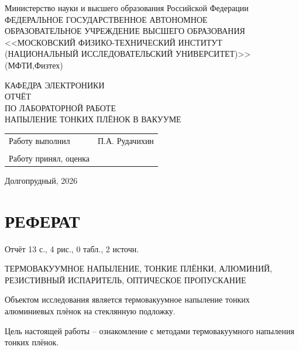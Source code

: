 \documentclass[a4paper, 14pt]{extarticle}
\begin{document}
	
	\begin{titlepage}
		\centering
		{ Министерство науки и высшего образования Российской Федерации\\
		ФЕДЕРАЛЬНОЕ ГОСУДАРСТВЕННОЕ АВТОНОМНОЕ \\
		ОБРАЗОВАТЕЛЬНОЕ УЧРЕЖДЕНИЕ ВЫСШЕГО ОБРАЗОВАНИЯ \\
		<<МОСКОВСКИЙ ФИЗИКО-ТЕХНИЧЕСКИЙ ИНСТИТУТ\\
		(НАЦИОНАЛЬНЫЙ ИССЛЕДОВАТЕЛЬСКИЙ УНИВЕРСИТЕТ)>>\\
		(МФТИ,Физтех)
		}
		
		\vspace{6cm}
		
		КАФЕДРА ЭЛЕКТРОНИКИ\\
		\vspace{0.5cm}
		ОТЧЁТ \\
		ПО ЛАБОРАТОРНОЙ РАБОТЕ\\
		\vspace{0.5cm}
		{{НАПЫЛЕНИЕ ТОНКИХ ПЛЁНОК В ВАКУУМЕ}\\}
		
		\vspace{5cm}
		
		\begin{tabular}{ll}
			Работу выполнил & \underline{\hspace{5cm}} П.А. Рудачихин \\
			&\\
			Работу принял, оценка & \underline{\hspace{9cm}} \\
		\end{tabular}
		\centering
		
		
		\vfill
		
		Долгопрудный, 2026
	\end{titlepage}
	
	\section*{РЕФЕРАТ}
	
	\hspace{11mm} Отчёт 13 с., 4 рис., 0 табл., 2 источн.
	
	ТЕРМОВАКУУМНОЕ НАПЫЛЕНИЕ, ТОНКИЕ ПЛЁНКИ, АЛЮМИНИЙ, РЕЗИСТИВНЫЙ ИСПАРИТЕЛЬ, ОПТИЧЕСКОЕ ПРОПУСКАНИЕ
	
	Объектом исследования является термовакуумное напыление тонких алюминиевых плёнок на стеклянную подложку.
	
	Цель настоящей работы -- ознакомление с методами термовакуумного напыления тонких плёнок. 
	
\end{document}
